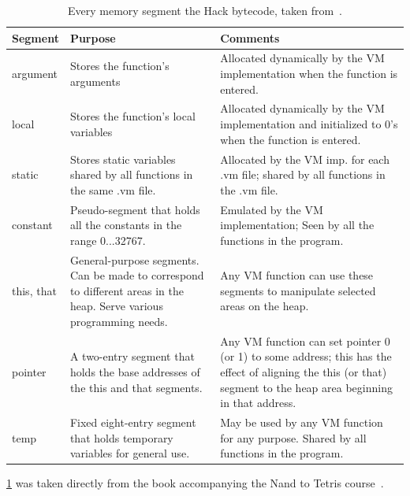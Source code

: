 \begin{table}[h]
  \begin{center}
    \centering
    \begin{tabularx}{\textwidth}{|l|X|X|}
      \toprule
      Segment        & Purpose              & Comments \\ \midrule
      argument     & Stores the function's arguments    & Allocated dynamically by the VM implementation when the function is entered.  \\ \midrule
      local     & Stores the function's local variables  & Allocated dynamically by the VM implementation and initialized to 0’s when the function is entered.  \\ \midrule
      static     & Stores static variables shared by all functions in the same .vm ﬁle.  & Allocated by the VM imp. for each .vm ﬁle; shared by all functions in the .vm ﬁle.  \\ \midrule
      constant     & Pseudo-segment that holds all the constants in the range 0...32767.  & Emulated by the VM implementation; Seen by all the functions in the program.  \\ \midrule
      this, that     & General-purpose segments. Can be made to correspond to different areas in the heap. Serve various programming needs.  & Any VM function can use these segments to manipulate selected areas on the heap.  \\ \midrule
      pointer     & A two-entry segment that holds the base addresses of the this and that segments.  & Any VM function can set pointer 0 (or 1) to some address; this has the effect of aligning the this (or that) segment to the heap area beginning in that address.  \\ \midrule
      temp     & Fixed eight-entry segment that holds temporary variables for general use.  & May be used by any VM function for any purpose. Shared by all functions in the program.  \\
      \bottomrule
    \end{tabularx}
    \caption{Every memory segment the Hack bytecode, taken from~\cite{nisan2005}.}
    \label{table:segments}
  \end{center}
\end{table}

\cref{table:segments} was taken directly from the book accompanying the Nand to Tetris course~\cite{nisan2005}.

